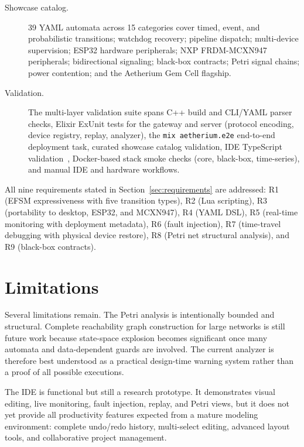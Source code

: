 \begin{description}
  \item[Showcase catalog.] 39 YAML automata across 15 categories cover timed, event, and probabilistic transitions; watchdog recovery; pipeline dispatch; multi-device supervision; ESP32 hardware peripherals; NXP FRDM-MCXN947 peripherals; bidirectional signaling; black-box contracts; Petri signal chains; power contention; and the Aetherium Gem Cell flagship.

  \item[Validation.] The multi-layer validation suite spans C++ build and CLI/YAML parser checks, Elixir ExUnit tests for the gateway and server (protocol encoding, device registry, replay, analyzer), the \texttt{mix aetherium.e2e} end-to-end deployment task, curated showcase catalog validation, IDE TypeScript validation~\cite{TypeScriptHandbook}, Docker-based stack smoke checks (core, black-box, time-series), and manual IDE and hardware workflows.
\end{description}

All nine requirements stated in Section~\ref{sec:requirements} are addressed: R1 (EFSM expressiveness with five transition types), R2 (Lua scripting), R3 (portability to desktop, ESP32, and MCXN947), R4 (YAML DSL), R5 (real-time monitoring with deployment metadata), R6 (fault injection), R7 (time-travel debugging with physical device restore), R8 (Petri net structural analysis), and R9 (black-box contracts).

\section{Limitations}
\label{sec:conclusion-limitations}

Several limitations remain. The Petri analysis is intentionally bounded and structural. Complete reachability graph construction for large networks is still future work because state-space explosion becomes significant once many automata and data-dependent guards are involved. The current analyzer is therefore best understood as a practical design-time warning system rather than a proof of all possible executions.

The IDE is functional but still a research prototype. It demonstrates visual editing, live monitoring, fault injection, replay, and Petri views, but it does not yet provide all productivity features expected from a mature modeling environment: complete undo/redo history, multi-select editing, advanced layout tools, and collaborative project management.

